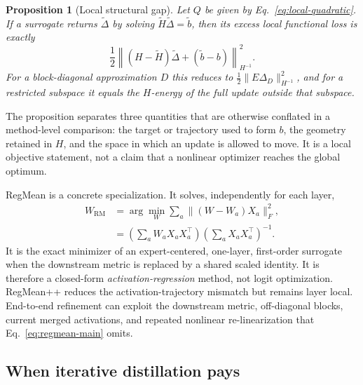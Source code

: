 \documentclass[letterpaper]{article} %
\theoremstyle{plain}
\newtheorem{proposition}[theorem]{Proposition}
\theoremstyle{definition}
\begin{document}
\begin{proposition}[Local structural gap]
\label{prop:local-gap-main}
Let $Q$ be given by Eq.~\eqref{eq:local-quadratic}.
If a surrogate returns $\widetilde\Delta$ by solving $\widetilde H\widetilde\Delta=\widetilde b$, then its excess local functional loss is exactly \[ \frac12\left\|(H-\widetilde H)\widetilde\Delta+(\widetilde b-b)\right\|_{H^{-1}}^2.
\] For a block-diagonal approximation $D$ this reduces to $\tfrac12\|E\Delta_D\|_{H^{-1}}^2$, and for a restricted subspace it equals the $H$-energy of the full update outside that subspace.
\end{proposition}

The proposition separates three quantities that are otherwise conflated in a method-level comparison: the target or trajectory used to form $b$, the geometry retained in $H$, and the space in which an update is allowed to move.
It is a local objective statement, not a claim that a nonlinear optimizer reaches the global optimum.

RegMean is a concrete specialization.
It solves, independently for each layer,
\begin{equation}
\begin{aligned}
W_{\mathrm{RM}}
&=\arg\min_W \sum_a\|(W-W_a)X_a\|_F^2,\\
&=\left(\sum_aW_aX_aX_a^\top\right)
  \left(\sum_aX_aX_a^\top\right)^{-1}.
\end{aligned}
\label{eq:regmean-main}
\end{equation}
It is the exact minimizer of an expert-centered, one-layer, first-order surrogate when the downstream metric is replaced by a shared scaled identity.
It is therefore a closed-form \emph{activation-regression} method, not logit optimization.
RegMean++ reduces the activation-trajectory mismatch but remains layer local.
End-to-end refinement can exploit the downstream metric, off-diagonal blocks, current merged activations, and repeated nonlinear re-linearization that Eq.~\eqref{eq:regmean-main} omits.

\subsection{When iterative distillation pays}
\label{sec:compute-error-main}
\end{document}
